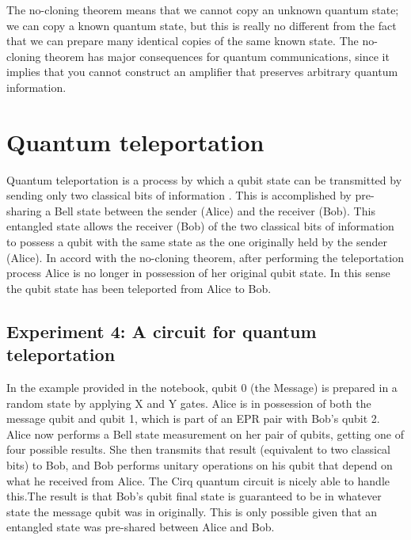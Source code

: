\documentclass[a4paper,11pt]{article}
\begin{document}
The no-cloning theorem means that we cannot copy an unknown quantum state; we can copy a known quantum state, but this is really no different
from the fact that we can prepare many identical copies of the same known state. The no-cloning theorem has major consequences for quantum
communications, since it implies that you cannot construct an amplifier that preserves arbitrary quantum information.




\section{Quantum teleportation}\label{sec:three}
Quantum teleportation is a process by which a qubit state can be transmitted by sending only two classical bits of information \cite{Bennett:1992tv}.
This is accomplished by pre-sharing a Bell state between the sender (Alice) and the receiver (Bob). 
This entangled state allows the receiver (Bob) of the two classical bits of information to possess a qubit with the same state as the one originally held by the sender (Alice).
In accord with the no-cloning theorem, after performing the teleportation process Alice is no longer in possession of her original qubit state. In this sense the qubit state
has been teleported from Alice to Bob.

\subsection{Experiment 4: A circuit for quantum teleportation} 
In the example provided in the notebook, qubit 0 (the Message) is prepared in a random state by applying X and Y gates. Alice is in possession of both the message qubit and
qubit 1, which is part of an EPR pair with Bob's qubit 2. Alice now performs a Bell state measurement on her pair of qubits, getting one of four possible results. She then
transmits that result (equivalent to two classical bits) to Bob, and Bob performs unitary operations on his qubit that depend on what he received from Alice.
The Cirq quantum circuit is nicely able to handle this.The result is that Bob's qubit final state is guaranteed to be in whatever state the message qubit
was in originally. This is only possible given that an entangled state was pre-shared between Alice and Bob.
\end{document}
